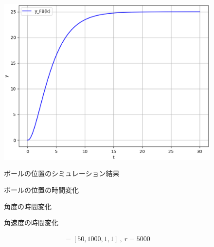 \documentclass[a4paper,10.5pt]{ltjsarticle}
\begin{document}
\begin{figure}[h]
  \vspace{-30pt}
  \centering
  \begin{minipage}{0.4\linewidth}
    \centering
    \includegraphics[scale=0.35]{figure19.eps}
    \caption{ボールの位置のシミュレーション結果}
    \label{fig:figure28}
  \end{minipage}
  \begin{minipage}[h]{0.4\linewidth}
    \centering
    
    \vspace{-30pt}\caption{ボールの位置の時間変化}
    \label{fig:figure29}
  \end{minipage}
  \begin{minipage}[h]{0.4\linewidth}
    \centering
    
    \vspace{-30pt}\caption{角度の時間変化}
    \label{fig:figure30}
  \end{minipage}
  \begin{minipage}[h]{0.4\linewidth}
    \centering
    
    \vspace{-30pt}\caption{角速度の時間変化}
    \label{fig:figure31}
  \end{minipage}
\end{figure}
\clearpage
\begin{align}
  [q_1,q_2,q_3,q_4]=[50,1000,1,1]\ ,\ r=5000
\end{align}
\end{document}
